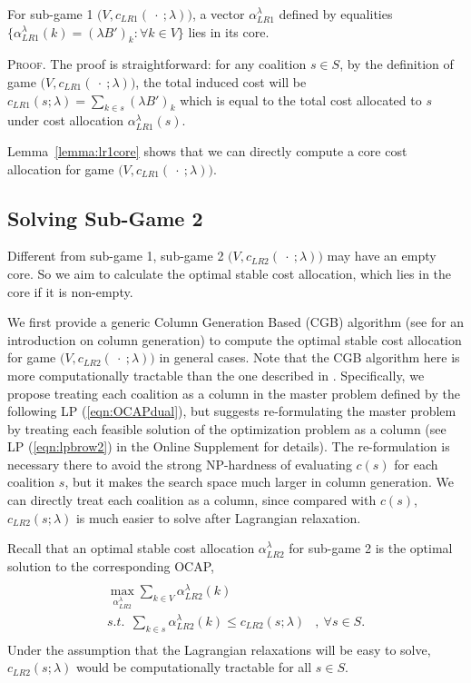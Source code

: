 \documentclass[ijoc,nonblindrev]{informs3} %
\begin{document}
\begin{lemma}\label{lemma:lr1core}
For sub-game 1 $\big(V,c_{LR1}(\ \cdot\ ;\lambda)\big)$, a vector $\alpha_{LR1}^{\lambda}$ defined by equalities $\{\alpha_{LR1}^{\lambda}(k) = (\lambda B')_k:\forall k \in V \}$ lies in its core.
\end{lemma}
{\scshape Proof.}
The proof is straightforward: for any coalition $s \in S$, by the definition of game $\big(V,c_{LR1}(\ \cdot\ ;\lambda)\big)$, the total induced cost will be $c_{LR1}(s;\lambda) = \sum_{k \in s} (\lambda B')_k$ which is equal to the total cost allocated to $s$ under cost allocation $\alpha_{LR1}^{\lambda}(s)$.
\hfill\Halmos

Lemma~\ref{lemma:lr1core} shows that we can directly compute a core cost allocation for game $\big(V,c_{LR1}(\ \cdot\ ;\lambda)\big)$.



\subsection{Solving Sub-Game 2}
\label{sec:sub-game-2}
Different from sub-game 1,  sub-game 2 $\big(V,c_{LR2}(\ \cdot\ ;\lambda)\big)$ may have an empty core. So we aim to calculate the optimal stable cost allocation, which lies in the core if it is non-empty.

We first provide a generic   Column Generation Based (CGB) algorithm (see \citealt{Barnhart1998CGB2} for an introduction on column generation) to compute the optimal stable cost allocation for game $\big(V,c_{LR2}(\ \cdot \ ;\lambda)\big)$ in general cases. Note that the CGB algorithm here is more computationally tractable  than the one described in \cite{Caprara2010LPB}.
Specifically, we propose treating each coalition as a column in the master problem defined by the following LP (\ref{eqn:OCAPdual}), but \cite{Caprara2010LPB} suggests re-formulating the master problem by treating each feasible solution of the optimization problem as a column (see LP (\ref{eqn:lpbrow2}) in the Online Supplement for details).
The re-formulation is necessary there to avoid the strong NP-hardness of evaluating $c(s)$ for each coalition $s$, but it makes the search space much larger in column generation. We can directly treat each coalition as a column, since compared with $c(s)$, $c_{LR2}(s;\lambda)$ is much easier to solve after Lagrangian relaxation.


Recall that an optimal stable cost allocation $\alpha_{LR2}^{\lambda}$ for sub-game 2 is the optimal solution to the corresponding OCAP,
\begin{eqnarray}\label{eqn:OCAPorg}
\begin{aligned}
\begin{split}
\max_{\alpha_{LR2}^{\lambda}} \sum_{k \in V} \alpha_{LR2}^{\lambda}(k)&\\
s.t.~~ \sum_{k \in s} \alpha_{LR2}^{\lambda}(k) \leq  c_{LR2}(s;\lambda)&,~ \forall s \in S.
\end{split}
\end{aligned}
\end{eqnarray}
Under the assumption that the Lagrangian relaxations will be easy to solve, $c_{LR2}(s;\lambda)$ would be computationally tractable for all $s \in S$.
\end{document}
